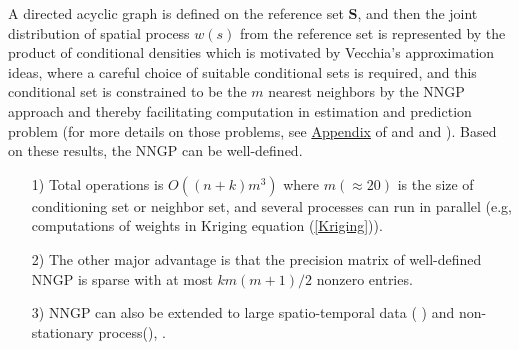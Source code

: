 \documentclass[
12pt, %
a4paper, %
oneside, %
headinclude,footinclude, %
BCOR5mm, %
]{scrartcl}
\begin{document}
A directed acyclic graph is defined on the reference set $\boldsymbol{S}$, and then the joint distribution of spatial process $w(s)$ from the reference set is represented by the product of conditional densities which is motivated by Vecchia’s approximation \citep{vecchia1988estimation} ideas, where a careful choice of suitable conditional sets is required, and this conditional set is constrained to be the $m$ nearest neighbors by the NNGP approach and thereby facilitating computation in estimation and prediction problem (for more details on those problems, see  \href{https://chenyw68.github.io/Literature/[2016]Hierarchical nearest-neighbor Gaussian process models for large geostatistical datasets-Appdix.pdf}{Appendix} of \href{https://chenyw68.github.io/Literature/[2016]Hierarchical nearest-neighbor Gaussian process models for large geostatistical datasets.pdf}{\cite{datta2016hierarchical}} and \href{https://chenyw68.github.io/Literature/[2017]Applying Nearest Neighbor Gaussian Processes to Massive Spatial Data Sets.pdf}{\citep{finley2017applying}} and \href{https://chenyw68.github.io/Literature/[2019]Efficient algorithms for bayesian nearest neighbor gaussian processes.pdf}{\cite{finley2019efficient}}). Based on these results, the NNGP can be well-defined.


\begin{itemize}
 \item [1)] Total operations is $O((n + k)m^3)$ where $m (\approx 20)$ is the size of conditioning set or neighbor set, and several processes can run in parallel (e.g, computations of weights in Kriging equation (\ref{Kriging})).
 \item [2)] The other major advantage is that the precision matrix of well-defined NNGP is sparse with at most $km(m + 1)/2$ nonzero entries.
 \item [3)] NNGP can also be extended to large spatio-temporal data (
\href{https://chenyw68.github.io/Literature/[2016]Nonseparable dynamic NNGP models for large spatio-temporal data.pdf}{\cite{datta2016nonseparable}}) and non-stationary process(\href{https://chenyw68.github.io/Literature/[2020]Computationally efficient nonstationary NNGP models using data-driven techniques.pdf}{\cite{konomi2019computationally}}), \href{https://chenyw68.github.io/Literature/[2020-formal]Bayesian inference for high dimensional nonstationary Gaussian processes.pdf}{\citep{risser2020bayesian}}.
\end{itemize}
\end{document}
